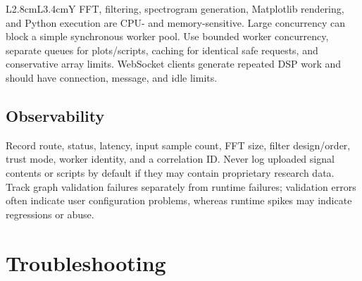 \documentclass[10pt,a4paper]{article}
\begin{document}
\begin{tabularx}{\textwidth}{L{2.8cm}L{3.4cm}Y}
FFT, filtering, spectrogram generation, Matplotlib rendering, and Python execution are CPU- and memory-sensitive. Large concurrency can block a simple synchronous worker pool. Use bounded worker concurrency, separate queues for plots/scripts, caching for identical safe requests, and conservative array limits. WebSocket clients generate repeated DSP work and should have connection, message, and idle limits.

\subsection{Observability}

Record route, status, latency, input sample count, FFT size, filter design/order, trust mode, worker identity, and a correlation ID. Never log uploaded signal contents or scripts by default if they may contain proprietary research data. Track graph validation failures separately from runtime failures; validation errors often indicate user configuration problems, whereas runtime spikes may indicate regressions or abuse.

\section{Troubleshooting}


\end{tabularx}
\end{document}
